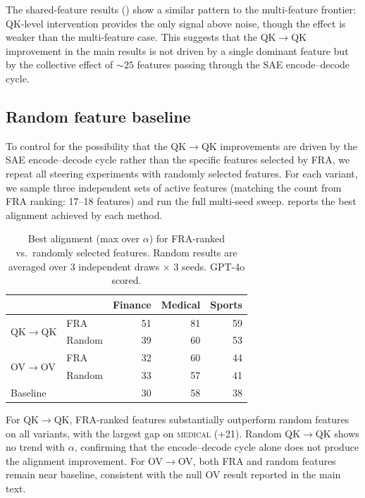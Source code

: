 \documentclass{article}
\theoremstyle{plain}
\theoremstyle{definition}
\theoremstyle{remark}
\begin{document}
The shared-feature results () show a similar pattern to the multi-feature frontier: QK-level intervention provides the only signal above noise, though the effect is weaker than the multi-feature case. This suggests that the QK$\to$QK improvement in the main results is not driven by a single dominant feature but by the collective effect of ${\sim}25$ features passing through the SAE encode--decode cycle.

\subsection{Random feature baseline}
\label{app:random_baseline}

To control for the possibility that the QK$\to$QK improvements are driven by the SAE encode--decode cycle rather than the specific features selected by FRA, we repeat all steering experiments with randomly selected features. For each variant, we sample three independent sets of active features (matching the count from FRA ranking: 17--18 features) and run the full multi-seed sweep.  reports the best alignment achieved by each method.

\begin{table}[h]
\caption{Best alignment (max over $\alpha$) for FRA-ranked vs.\ randomly selected features. Random results are averaged over 3 independent draws $\times$ 3 seeds. GPT-4o scored.}
\label{tab:random_baseline}
\centering
\small
\begin{tabular}{llrrr}
\toprule
 & & Finance & Medical & Sports \\
\midrule
\multirow{2}{*}{QK$\to$QK} & FRA & 51 & 81 & 59 \\
 & Random & 39 & 60 & 53 \\
\midrule
\multirow{2}{*}{OV$\to$OV} & FRA & 32 & 60 & 44 \\
 & Random & 33 & 57 & 41 \\
\midrule
Baseline & & 30 & 58 & 38 \\
\bottomrule
\end{tabular}
\end{table}

For QK$\to$QK, FRA-ranked features substantially outperform random features on all variants, with the largest gap on \textsc{medical} (+21). Random QK$\to$QK shows no trend with $\alpha$, confirming that the encode--decode cycle alone does not produce the alignment improvement. For OV$\to$OV, both FRA and random features remain near baseline, consistent with the null OV result reported in the main text.
\end{document}
